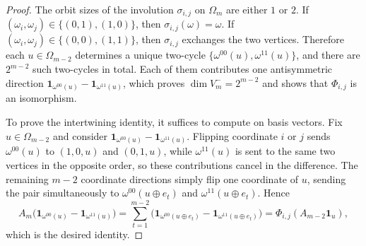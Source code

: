 \begin{proof}
The orbit sizes of the involution \(\sigma_{i,j}\) on \(\Omega_m\) are either \(1\) or \(2\).
If \((\omega_i,\omega_j)\in\{(0,1),(1,0)\}\), then \(\sigma_{i,j}(\omega)=\omega\).
If \((\omega_i,\omega_j)\in\{(0,0),(1,1)\}\), then \(\sigma_{i,j}\) exchanges the two vertices.
Therefore each \(u\in\Omega_{m-2}\) determines a unique two-cycle \(\{\omega^{00}(u),\omega^{11}(u)\}\), and there are \(2^{m-2}\) such two-cycles in total.
Each of them contributes one antisymmetric direction
\(
\mathbf 1_{\omega^{00}(u)}-\mathbf 1_{\omega^{11}(u)}
\),
which proves \(\dim V_m^-=2^{m-2}\) and shows that \(\Phi_{i,j}\) is an isomorphism.
\par
To prove the intertwining identity, it suffices to compute on basis vectors.
Fix \(u\in\Omega_{m-2}\) and consider
\(
\mathbf 1_{\omega^{00}(u)}-\mathbf 1_{\omega^{11}(u)}
\).
Flipping coordinate \(i\) or \(j\) sends \(\omega^{00}(u)\) to \((1,0,u)\) and \((0,1,u)\), while \(\omega^{11}(u)\) is sent to the same two vertices in the opposite order, so these contributions cancel in the difference.
The remaining \(m-2\) coordinate directions simply flip one coordinate of \(u\), sending the pair simultaneously to \(\omega^{00}(u\oplus e_t)\) and \(\omega^{11}(u\oplus e_t)\).
Hence
\[
A_m\bigl(\mathbf 1_{\omega^{00}(u)}-\mathbf 1_{\omega^{11}(u)}\bigr)
=\sum_{t=1}^{m-2}\bigl(\mathbf 1_{\omega^{00}(u\oplus e_t)}-\mathbf 1_{\omega^{11}(u\oplus e_t)}\bigr)
=\Phi_{i,j}(A_{m-2}\mathbf 1_u),
\]
which is the desired identity. \qedhere
\end{proof}

